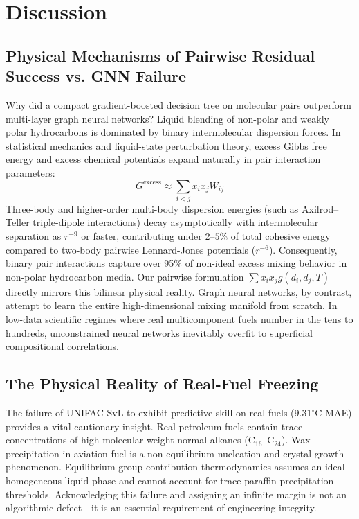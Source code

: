 \documentclass[11pt,a4paper]{article}
\begin{document}
\section{Discussion}

\subsection{Physical Mechanisms of Pairwise Residual Success vs. GNN Failure}
Why did a compact gradient-boosted decision tree on molecular pairs outperform multi-layer graph neural networks? Liquid blending of non-polar and weakly polar hydrocarbons is dominated by binary intermolecular dispersion forces. In statistical mechanics and liquid-state perturbation theory, excess Gibbs free energy and excess chemical potentials expand naturally in pair interaction parameters:
\begin{equation}
    G^{\text{excess}} \approx \sum_{i < j} x_i x_j W_{ij}
\end{equation}
Three-body and higher-order multi-body dispersion energies (such as Axilrod--Teller triple-dipole interactions) decay asymptotically with intermolecular separation as $r^{-9}$ or faster, contributing under $2\text{--}5\%$ of total cohesive energy compared to two-body pairwise Lennard-Jones potentials ($r^{-6}$). Consequently, binary pair interactions capture over 95\% of non-ideal excess mixing behavior in non-polar hydrocarbon media. Our pairwise formulation $\sum x_i x_j g(d_i, d_j, T)$ directly mirrors this bilinear physical reality. Graph neural networks, by contrast, attempt to learn the entire high-dimensional mixing manifold from scratch. In low-data scientific regimes where real multicomponent fuels number in the tens to hundreds, unconstrained neural networks inevitably overfit to superficial compositional correlations.

\subsection{The Physical Reality of Real-Fuel Freezing}
The failure of UNIFAC-SvL to exhibit predictive skill on real fuels ($9.31^\circ\text{C}$ MAE) provides a vital cautionary insight. Real petroleum fuels contain trace concentrations of high-molecular-weight normal alkanes ($\text{C}_{16}$--$\text{C}_{24}$). Wax precipitation in aviation fuel is a non-equilibrium nucleation and crystal growth phenomenon. Equilibrium group-contribution thermodynamics assumes an ideal homogeneous liquid phase and cannot account for trace paraffin precipitation thresholds. Acknowledging this failure and assigning an infinite margin is not an algorithmic defect—it is an essential requirement of engineering integrity.
\end{document}
